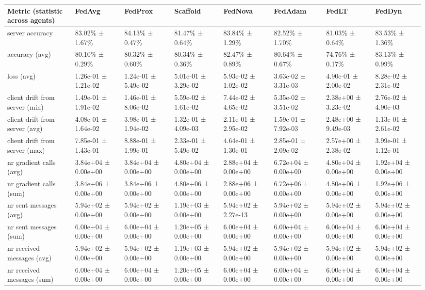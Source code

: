 \begin{tabular}{llllllll}
\hline
 Metric (statistic across agents)   & FedAvg              & FedProx             & Scaffold            & FedNova             & FedAdam             & FedLT               & FedDyn              \\
\hline
 server accuracy                    & 83.02\% ± 1.67\%      & 84.13\% ± 0.47\%      & 81.47\% ± 0.64\%      & 83.84\% ± 1.29\%      & 82.52\% ± 1.70\%      & 81.03\% ± 0.64\%      & 83.53\% ± 1.36\%      \\
 accuracy (avg)                     & 80.10\% ± 0.29\%      & 80.32\% ± 0.60\%      & 80.34\% ± 0.36\%      & 82.47\% ± 0.89\%      & 80.64\% ± 0.67\%      & 74.76\% ± 0.17\%      & 83.13\% ± 0.99\%      \\
 loss (avg)                         & 1.26e-01 ± 1.21e-02 & 1.24e-01 ± 5.49e-02 & 5.01e-01 ± 3.29e-02 & 5.93e-02 ± 1.02e-02 & 3.63e-02 ± 3.31e-03 & 4.90e-01 ± 2.00e-02 & 8.28e-02 ± 2.31e-02 \\
 client drift from server (min)     & 1.49e-01 ± 1.91e-02 & 1.46e-01 ± 8.06e-02 & 5.59e-02 ± 1.61e-02 & 7.44e-02 ± 4.65e-02 & 5.35e-02 ± 3.51e-02 & 2.38e+00 ± 3.23e-02 & 2.76e-02 ± 4.90e-03 \\
 client drift from server (avg)     & 4.08e-01 ± 1.64e-02 & 3.98e-01 ± 1.94e-02 & 1.32e-01 ± 4.09e-03 & 2.11e-01 ± 2.95e-02 & 1.59e-01 ± 7.92e-03 & 2.48e+00 ± 9.49e-03 & 1.13e-01 ± 2.61e-02 \\
 client drift from server (max)     & 7.85e-01 ± 1.43e-01 & 8.88e-01 ± 1.99e-01 & 2.33e-01 ± 5.49e-02 & 4.64e-01 ± 1.30e-01 & 2.85e-01 ± 2.09e-02 & 2.57e+00 ± 2.38e-02 & 3.99e-01 ± 1.12e-01 \\
 nr gradient calls (avg)            & 3.84e+04 ± 0.00e+00 & 3.84e+04 ± 0.00e+00 & 4.80e+04 ± 0.00e+00 & 2.88e+04 ± 0.00e+00 & 6.72e+04 ± 0.00e+00 & 4.80e+04 ± 0.00e+00 & 1.92e+04 ± 0.00e+00 \\
 nr gradient calls (sum)            & 3.84e+06 ± 0.00e+00 & 3.84e+06 ± 0.00e+00 & 4.80e+06 ± 0.00e+00 & 2.88e+06 ± 0.00e+00 & 6.72e+06 ± 0.00e+00 & 4.80e+06 ± 0.00e+00 & 1.92e+06 ± 0.00e+00 \\
 nr sent messages (avg)             & 5.94e+02 ± 0.00e+00 & 5.94e+02 ± 0.00e+00 & 1.19e+03 ± 0.00e+00 & 5.94e+02 ± 2.27e-13 & 5.94e+02 ± 0.00e+00 & 5.94e+02 ± 0.00e+00 & 5.94e+02 ± 0.00e+00 \\
 nr sent messages (sum)             & 6.00e+04 ± 0.00e+00 & 6.00e+04 ± 0.00e+00 & 1.20e+05 ± 0.00e+00 & 6.00e+04 ± 0.00e+00 & 6.00e+04 ± 0.00e+00 & 6.00e+04 ± 0.00e+00 & 6.00e+04 ± 0.00e+00 \\
 nr received messages (avg)         & 5.94e+02 ± 0.00e+00 & 5.94e+02 ± 0.00e+00 & 1.19e+03 ± 0.00e+00 & 5.94e+02 ± 0.00e+00 & 5.94e+02 ± 0.00e+00 & 5.94e+02 ± 0.00e+00 & 5.94e+02 ± 0.00e+00 \\
 nr received messages (sum)         & 6.00e+04 ± 0.00e+00 & 6.00e+04 ± 0.00e+00 & 1.20e+05 ± 0.00e+00 & 6.00e+04 ± 0.00e+00 & 6.00e+04 ± 0.00e+00 & 6.00e+04 ± 0.00e+00 & 6.00e+04 ± 0.00e+00 \\
\hline
\end{tabular}